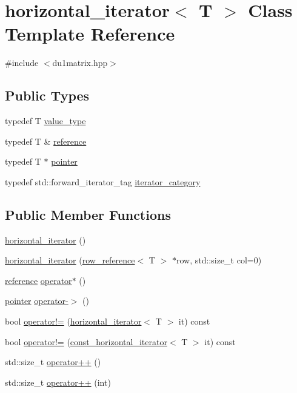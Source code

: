 \hypertarget{classhorizontal__iterator}{\section{horizontal\-\_\-iterator$<$ T $>$ Class Template Reference}
\label{classhorizontal__iterator}
}


{\ttfamily \#include $<$du1matrix.\-hpp$>$}

\subsection*{Public Types}
\begin{DoxyCompactItemize}
\item 
typedef T \hyperlink{classhorizontal__iterator_aecda8c123296e42db62e8cc706428f71}{value\-\_\-type}
\item 
typedef T \& \hyperlink{classhorizontal__iterator_a286f6a9e1498bd52e0ddcf8b1bff78f8}{reference}
\item 
typedef T $\ast$ \hyperlink{classhorizontal__iterator_a2fde5b2bd7677798fe3ca0d8e614c039}{pointer}
\item 
typedef std\-::forward\-\_\-iterator\-\_\-tag \hyperlink{classhorizontal__iterator_ab7d0fbb5c4be316048d3199a56b2090b}{iterator\-\_\-category}
\end{DoxyCompactItemize}
\subsection*{Public Member Functions}
\begin{DoxyCompactItemize}
\item 
\hyperlink{classhorizontal__iterator_ac272fd0aa7791a8a397f82aee9d00ef1}{horizontal\-\_\-iterator} ()
\item 
\hyperlink{classhorizontal__iterator_a98576d3ed4624ce9d713c3b7ed3905ff}{horizontal\-\_\-iterator} (\hyperlink{classrow__reference}{row\-\_\-reference}$<$ T $>$ $\ast$row, std\-::size\-\_\-t col=0)
\item 
\hyperlink{classhorizontal__iterator_a286f6a9e1498bd52e0ddcf8b1bff78f8}{reference} \hyperlink{classhorizontal__iterator_acd4d244d00d8028b4263f267c7809b8d}{operator$\ast$} ()
\item 
\hyperlink{classhorizontal__iterator_a2fde5b2bd7677798fe3ca0d8e614c039}{pointer} \hyperlink{classhorizontal__iterator_a350d2cdc42622f39b921b19eac5c0aa6}{operator-\/$>$} ()
\item 
bool \hyperlink{classhorizontal__iterator_a6f85e779438e41bcc76383645d56ad20}{operator!=} (\hyperlink{classhorizontal__iterator}{horizontal\-\_\-iterator}$<$ T $>$ it) const 
\item 
bool \hyperlink{classhorizontal__iterator_a048454bfd02da9d45396fba236de86db}{operator!=} (\hyperlink{classconst__horizontal__iterator}{const\-\_\-horizontal\-\_\-iterator}$<$ T $>$ it) const 
\item 
std\-::size\-\_\-t \hyperlink{classhorizontal__iterator_a6986f3de1fdc42860328bf893320abf3}{operator++} ()
\item 
std\-::size\-\_\-t \hyperlink{classhorizontal__iterator_a071590045a120b5294aa78195f41781e}{operator++} (int)
\end{DoxyCompactItemize}
